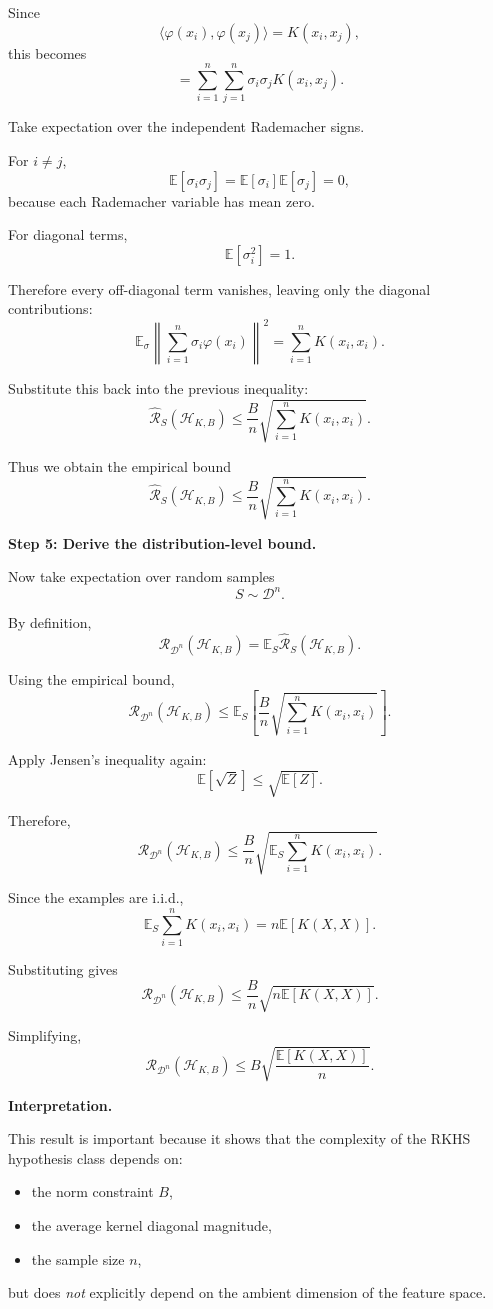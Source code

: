 \documentclass[11pt]{article}
\newcommand{\E}{\mathbb{E}}
\begin{document}
\begin{enumerate}
\begin{solutionbox}
Since
\[
\langle
\varphi(x_i),
\varphi(x_j)
\rangle
=
K(x_i,x_j),
\]
this becomes
\[
=
\sum_{i=1}^n
\sum_{j=1}^n
\sigma_i\sigma_j
K(x_i,x_j).
\]

Take expectation over the independent Rademacher signs.

For $i\neq j$,
\[
\E[\sigma_i\sigma_j]
=
\E[\sigma_i]\E[\sigma_j]
=
0,
\]
because each Rademacher variable has mean zero.

For diagonal terms,
\[
\E[\sigma_i^2]=1.
\]

Therefore every off-diagonal term vanishes, leaving only the diagonal contributions:
\[
\E_\sigma
\left\|
\sum_{i=1}^n\sigma_i\varphi(x_i)
\right\|^2
=
\sum_{i=1}^n
K(x_i,x_i).
\]

Substitute this back into the previous inequality:
\[
\widehat{\mathcal R}_S(\mathcal H_{K,B})
\le
\frac{B}{n}
\sqrt{
\sum_{i=1}^nK(x_i,x_i)
}.
\]

Thus we obtain the empirical bound
\[
\boxed{
\widehat{\mathcal R}_S(\mathcal H_{K,B})
\le
\frac{B}{n}
\sqrt{
\sum_{i=1}^nK(x_i,x_i)
}.
}
\]

\medskip

\textbf{Step 5: Derive the distribution-level bound.}

Now take expectation over random samples
\[
S\sim\mathcal D^n.
\]

By definition,
\[
\mathcal R_{\mathcal D^n}(\mathcal H_{K,B})
=
\E_S
\widehat{\mathcal R}_S(\mathcal H_{K,B}).
\]

Using the empirical bound,
\[
\mathcal R_{\mathcal D^n}(\mathcal H_{K,B})
\le
\E_S
\left[
\frac{B}{n}
\sqrt{
\sum_{i=1}^nK(x_i,x_i)
}
\right].
\]

Apply Jensen's inequality again:
\[
\E[\sqrt{Z}]
\le
\sqrt{\E[Z]}.
\]

Therefore,
\[
\mathcal R_{\mathcal D^n}(\mathcal H_{K,B})
\le
\frac{B}{n}
\sqrt{
\E_S
\sum_{i=1}^nK(x_i,x_i)
}.
\]

Since the examples are i.i.d.,
\[
\E_S
\sum_{i=1}^nK(x_i,x_i)
=
n\E[K(X,X)].
\]

Substituting gives
\[
\mathcal R_{\mathcal D^n}(\mathcal H_{K,B})
\le
\frac{B}{n}
\sqrt{
n\E[K(X,X)]
}.
\]

Simplifying,
\[
\boxed{
\mathcal R_{\mathcal D^n}(\mathcal H_{K,B})
\le
B
\sqrt{
\frac{\E[K(X,X)]}{n}
}.
}
\]

\medskip

\textbf{Interpretation.}

This result is important because it shows that the complexity of the RKHS hypothesis class depends on:
\begin{itemize}
    \item the norm constraint $B$,
    \item the average kernel diagonal magnitude,
    \item the sample size $n$,
\end{itemize}
but does \emph{not} explicitly depend on the ambient dimension of the feature space.


\end{solutionbox}
\end{enumerate}
\end{document}
